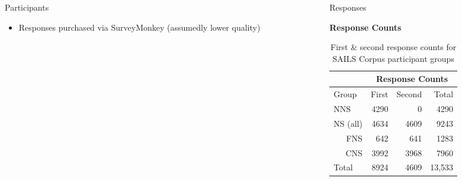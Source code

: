 \documentclass[final,14pt,t]{beamer}
\begin{document}
\begin{frame}{}
\begin{columns}[t]
\begin{column}{.33\linewidth}
\begin{minipage}[t][\textheight]{\linewidth}
\begin{block}{Participants}
\begin{center}
\begin{minipage}{.85\textwidth}
\begin{itemize}
\begin{itemize}
\begin{itemize}
				\item Responses purchased via SurveyMonkey (assumedly lower quality)
			\end{itemize}
		\end{itemize}
	\end{itemize}
	\vspace{1.3em}
\end{minipage}
\end{center}
\vspace{-.5em}
\end{block}
\end{minipage}
\end{column}

\begin{column}{.33\linewidth}
\begin{minipage}[t][\textheight]{\linewidth} 

\vspace{-1.7em}

\begin{block}{Responses}
\begin{center}
\begin{minipage}{.85\textwidth}


\begin{center}
  \textbf{Response Counts}
\end{center}

\begin{table}[htb!]
\begin{center}
\setlength{\tabcolsep}{0.65em}
\begin{tabular}{|l||r|r||r|}
\hline
& \multicolumn{3}{|c|}{Response Counts} \\
\hline
 Group & First & Second & Total \\
\hline
\hline
NNS & 4290 & 0 & 4290 \\
\hline
\hline
NS (all) & 4634 & 4609 & 9243 \\ 
\hline
\multicolumn{1}{|r||}{FNS} & 642 & 641 & 1283 \\ 
\hline
\multicolumn{1}{|r||}{CNS} & 3992 & 3968 & 7960 \\
\hline
\hline
Total & 8924 & 4609 & 13,533 \\
\hline
\end{tabular}
\caption{\label{tab:response-counts} First \& second response counts for SAILS Corpus participant groups}
\end{center}
\end{table}


\end{minipage}
\end{center}
\end{block}
\end{minipage}
\end{column}
\end{columns}
\end{frame}
\end{document}
